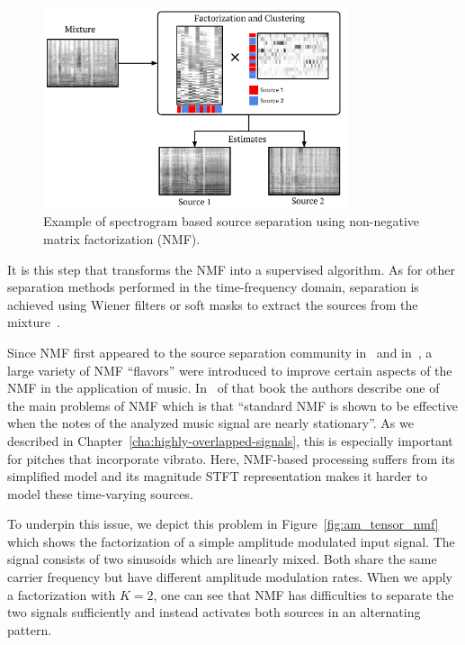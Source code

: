 \begin{figure}[h]
  \centering
  \includegraphics[width=0.8\textwidth]{Chapters/06_Separation_Unknown/figures/nmf_separation.pdf}
  \caption{Example of spectrogram based source separation using non-negative matrix factorization (NMF).}
  \label{fig:nmf_separation}
\end{figure}

It is this step that transforms the NMF into a supervised algorithm.
As for other separation methods performed in the time-frequency domain, separation is achieved using Wiener filters or soft masks to extract the sources from the mixture~\cite{liutkus15c}.
\par
Since NMF first appeared to the source separation community in~\cite{smaragdis03} and in~\cite{vembu05}, a large variety of NMF ``flavors'' were introduced to improve certain aspects of the NMF in the application of music. 
In~\cite[Chapter 16]{vincent} of that book the authors describe one of the main problems of NMF which is that ``standard NMF is shown to be effective when the notes of the analyzed music signal are nearly stationary''.
As we described in Chapter~\ref{cha:highly-overlapped-signals}, this is especially important for pitches that incorporate vibrato.
Here, NMF-based processing suffers from its simplified model and its magnitude STFT representation makes it harder to model these time-varying sources.
\par
To underpin this issue, we depict this problem in Figure~\ref{fig:am_tensor_nmf} which shows the factorization of a simple amplitude modulated input signal. 
The signal consists of two sinusoids which are linearly mixed. 
Both share the same carrier frequency but have different amplitude modulation rates. 
When we apply a factorization with $K=2$, one can see that NMF has difficulties to separate the two signals sufficiently and instead activates both sources in an alternating pattern.

